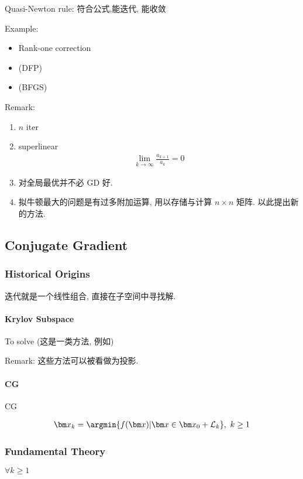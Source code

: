 Quasi-Newton rule: 符合公式,能迭代, 能收敛

Example:
\begin{itemize}
    \item Rank-one correction
    \item (DFP)
    \item (BFGS)
\end{itemize}

Remark:
\begin{enumerate}
    \item $n$ iter
    \item superlinear 
    \begin{align*}
        \lim_{k\to\infty}\frac{a_{k+1}}{a_k}=0
    \end{align*}
    \item 对全局最优并不必 GD 好. 
    \item 拟牛顿最大的问题是有过多附加运算, 用以存储与计算 $n\times n$ 矩阵. 以此提出新的方法. 
\end{enumerate}

\subsection{Conjugate Gradient}
\subsubsection{Historical Origins}
迭代就是一个线性组合, 直接在子空间中寻找解. 
\paragraph{Krylov Subspace} To solve (这是一类方法, 例如)

Remark: 这些方法可以被看做为投影. 

\paragraph{CG}CG 

\begin{align*}
    \bm x_k=\argmin\{ f(\bm x)|\bm x\in \bm x_0+\mathcal{L}_k \},\ k\ge 1
\end{align*}

\subsubsection{Fundamental Theory}

\begin{lemma}
    $\forall k\ge 1$
\end{lemma}

